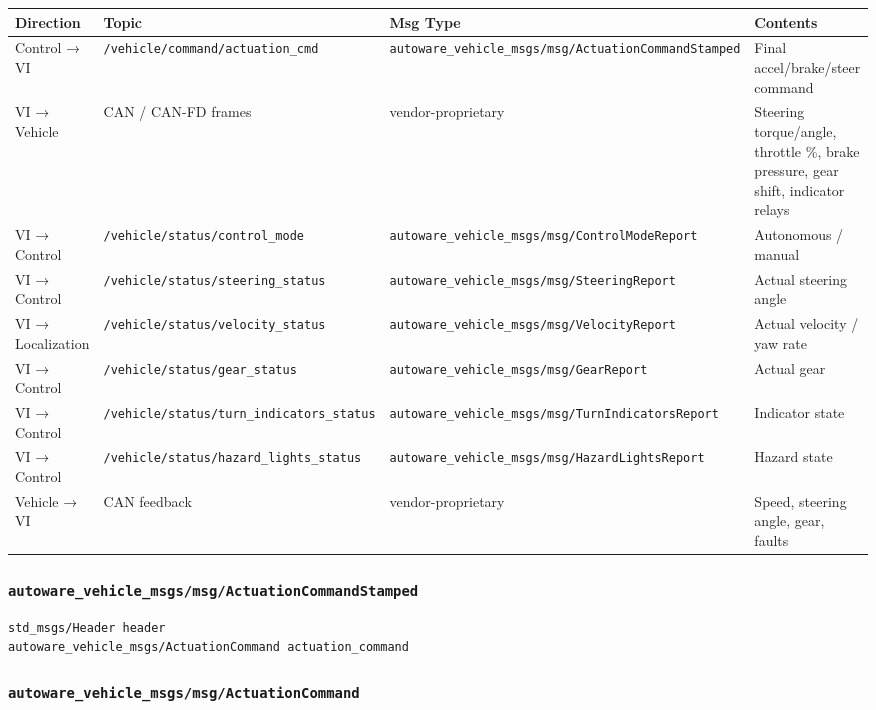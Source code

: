 \documentclass[
]{article}
\begin{document}
\begin{longtable}[]{@{}llll@{}}
\toprule\noalign{}
Direction & Topic & Msg Type & Contents \\
\midrule\noalign{}
\endhead
\bottomrule\noalign{}
\endlastfoot
Control → VI & \texttt{/vehicle/command/actuation\_cmd} &
\texttt{autoware\_vehicle\_msgs/msg/ActuationCommandStamped} & Final
accel/brake/steer command \\
VI → Vehicle & CAN / CAN-FD frames & vendor-proprietary & Steering
torque/angle, throttle \%, brake pressure, gear shift, indicator
relays \\
VI → Control & \texttt{/vehicle/status/control\_mode} &
\texttt{autoware\_vehicle\_msgs/msg/ControlModeReport} & Autonomous /
manual \\
VI → Control & \texttt{/vehicle/status/steering\_status} &
\texttt{autoware\_vehicle\_msgs/msg/SteeringReport} & Actual steering
angle \\
VI → Localization & \texttt{/vehicle/status/velocity\_status} &
\texttt{autoware\_vehicle\_msgs/msg/VelocityReport} & Actual velocity /
yaw rate \\
VI → Control & \texttt{/vehicle/status/gear\_status} &
\texttt{autoware\_vehicle\_msgs/msg/GearReport} & Actual gear \\
VI → Control & \texttt{/vehicle/status/turn\_indicators\_status} &
\texttt{autoware\_vehicle\_msgs/msg/TurnIndicatorsReport} & Indicator
state \\
VI → Control & \texttt{/vehicle/status/hazard\_lights\_status} &
\texttt{autoware\_vehicle\_msgs/msg/HazardLightsReport} & Hazard
state \\
Vehicle → VI & CAN feedback & vendor-proprietary & Speed, steering
angle, gear, faults \\
\end{longtable}

\subsubsection{\texorpdfstring{\texttt{autoware\_vehicle\_msgs/msg/ActuationCommandStamped}}{autoware\_vehicle\_msgs/msg/ActuationCommandStamped}}\label{autoware_vehicle_msgsmsgactuationcommandstamped}

\begin{verbatim}
std_msgs/Header header
autoware_vehicle_msgs/ActuationCommand actuation_command
\end{verbatim}

\subsubsection{\texorpdfstring{\texttt{autoware\_vehicle\_msgs/msg/ActuationCommand}}{autoware\_vehicle\_msgs/msg/ActuationCommand}}\label{autoware_vehicle_msgsmsgactuationcommand}
\end{document}
